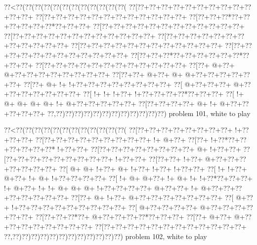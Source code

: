 \vbox{\vbox{\goo
\0??<\0??(\0??(\0??(\0??(\0??(\0??(\0??(\0??(\0??(\0??(\0??(\0??(
\0??[\0??+\0??+\0??+\0??+\0??+\0??+\0??+\0??+\0??+\0??+\0??+\0??+
\0??[\0??+\0??+\0??+\0??+\0??+\0??+\0??+\0??+\0??+\0??+\0??+\0??+
\0??[\0??+\0??+\0??*\0??+\0??+\0??+\0??+\0??+\0??*\0??+\0??+\0??+
\0??[\0??+\0??+\0??+\0??+\0??+\0??+\0??+\0??+\0??+\0??+\0??+\0??+
\0??[\0??+\0??+\0??+\0??+\0??+\0??+\0??+\0??+\0??+\0??+\0??+\0??+
\0??[\0??+\0??+\0??+\0??+\0??+\0??+\0??+\0??+\0??+\0??+\0??+\0??+
\0??[\0??+\0??+\0??+\0??+\0??+\0??+\0??+\0??+\0??+\0??+\0??+\0??+
\0??[\0??+\0??+\0??+\0??+\0??+\0??+\0??+\0??+\0??+\0??+\0??+\0??+
\0??[\0??+\0??+\0??*\0??+\0??+\0??+\0??+\0??+\0??*\0??+\0??+\0??+
\0??[\0??+\0??+\0??+\0??+\0??+\0??+\0??+\0??+\0??+\0??+\0??+\0??+
\0??[\0??+\- @+\0??+\- @+\0??+\0??+\0??+\0??+\0??+\0??+\0??+\0??+
\0??[\0??+\0??+\- @+\0??+\- @+\- @+\0??+\0??+\0??+\0??+\0??+\0??+
\0??[\0??+\- @+\- !+\- !+\0??+\0??+\0??+\0??+\0??+\0??+\0??+\0??+
\0??[\- @+\0??+\0??+\0??+\- @+\0??+\0??+\0??+\0??+\0??+\0??+\0??+
\0??[\- !+\- !+\- !+\0??+\- !+\0??+\0??+\0??+\0??*\0??+\0??+\0??+
\0??[\- !+\- @+\- @+\- @+\- @+\- !+\- @+\0??+\0??+\0??+\0??+\0??+
\0??[\0??+\0??+\0??+\0??+\- @+\- !+\- @+\0??+\0??+\0??+\0??+\0??+
\0??,\0??)\0??)\0??)\0??)\0??)\0??)\0??)\0??)\0??)\0??)\0??)\0??)
}
\hfil problem 101, white to play\hfil\break
}

\vbox{\vbox{\goo
\0??<\0??(\0??(\0??(\0??(\0??(\0??(\0??(\0??(\0??(\0??(\0??(\0??(
\0??[\0??+\0??+\0??+\0??+\0??+\0??+\0??+\0??+\- !+\0??+\0??+\0??+
\0??[\0??+\0??+\0??+\0??+\0??+\0??+\0??+\0??+\0??+\- !+\- @+\0??+
\0??[\0??+\- !+\0??*\0??+\0??+\0??+\0??+\0??+\0??*\- !+\0??+\0??+
\0??[\0??+\0??+\0??+\0??+\0??+\0??+\0??+\0??+\- @+\- !+\0??+\0??+
\0??[\0??+\0??+\0??+\0??+\0??+\0??+\0??+\0??+\0??+\- !+\0??+\0??+
\0??[\0??+\0??+\- !+\0??+\- @+\0??+\0??+\0??+\0??+\0??+\0??+\0??+
\0??[\- @+\- @+\- !+\0??+\- @+\- !+\0??+\- !+\0??+\- !+\0??+\0??+
\0??[\- !+\- !+\0??+\- @+\0??+\- !+\- @+\- !+\0??+\0??+\0??+\0??+
\0??[\- !+\- @+\- @+\0??+\- !+\- @+\- !+\- !+\0??*\0??+\0??+\0??+
\- !+\- @+\0??+\- !+\- !+\- @+\- @+\- @+\- !+\0??+\0??+\0??+\0??+
\- @+\0??+\0??+\- !+\- @+\0??+\0??+\0??+\0??+\0??+\0??+\0??+\0??+
\0??[\0??+\- @+\- !+\0??+\- @+\0??+\0??+\0??+\0??+\0??+\0??+\0??+
\0??[\- @+\0??+\- !+\0??+\0??+\0??+\0??+\0??+\0??+\0??+\0??+\0??+
\0??[\- @+\0??+\0??+\0??+\0??+\- @+\0??+\0??+\0??+\0??+\0??+\0??+
\0??[\0??+\0??+\0??*\0??+\- @+\0??+\0??+\0??+\0??*\0??+\0??+\0??+
\0??[\0??+\- @+\0??+\- @+\0??+\0??+\0??+\0??+\0??+\0??+\0??+\0??+
\0??[\0??+\0??+\0??+\0??+\0??+\0??+\0??+\0??+\0??+\0??+\0??+\0??+
\0??,\0??)\0??)\0??)\0??)\0??)\0??)\0??)\0??)\0??)\0??)\0??)\0??)
}
\hfil problem 102, white to play\hfil\break
}

